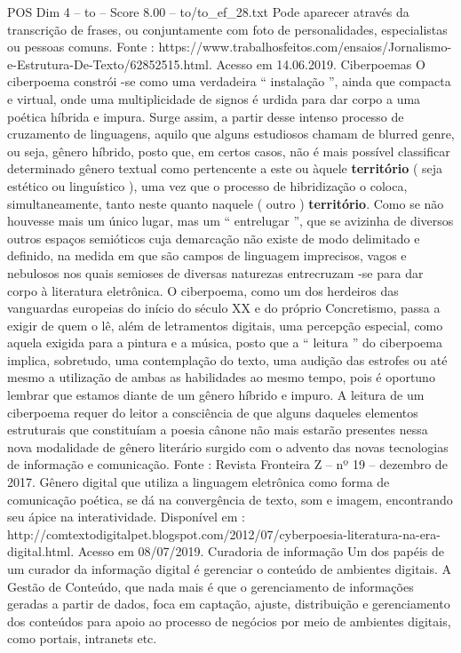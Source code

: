 \begin{textsample}{POS Dim 4 – to – Score 8.00 – to/to\_ef\_28.txt}
Pode aparecer através da transcrição de frases, ou conjuntamente com foto de personalidades, especialistas ou pessoas comuns.
Fonte : https://www.trabalhosfeitos.com/ensaios/Jornalismo-e-Estrutura-De-Texto/62852515.html.
Acesso em 14.06.2019.
Ciberpoemas O ciberpoema constrói -se como uma verdadeira “ instalação ”, ainda que compacta e virtual, onde uma multiplicidade de signos é urdida para dar corpo a uma poética híbrida e impura.
Surge assim, a partir desse intenso processo de cruzamento de linguagens, aquilo que alguns estudiosos chamam de blurred genre, ou seja, gênero híbrido, posto que, em certos casos, não é mais possível classificar determinado gênero textual como pertencente a este ou àquele \textbf{território} ( seja estético ou linguístico ), uma vez que o processo de hibridização o coloca, simultaneamente, tanto neste quanto naquele ( outro ) \textbf{território}.
Como se não houvesse mais um único lugar, mas um “ entrelugar ”, que se avizinha de diversos outros espaços semióticos cuja demarcação não existe de modo delimitado e definido, na medida em que são campos de linguagem imprecisos, vagos e nebulosos nos quais semioses de diversas naturezas entrecruzam -se para dar corpo à literatura eletrônica.
O ciberpoema, como um dos herdeiros das vanguardas europeias do início do século XX e do próprio Concretismo, passa a exigir de quem o lê, além de letramentos digitais, uma percepção especial, como aquela exigida para a pintura e a música, posto que a “ leitura ” do ciberpoema implica, sobretudo, uma contemplação do texto, uma audição das estrofes ou até mesmo a utilização de ambas as habilidades ao mesmo tempo, pois é oportuno lembrar que estamos diante de um gênero híbrido e impuro.
A leitura de um ciberpoema requer do leitor a consciência de que alguns daqueles elementos estruturais que constituíam a poesia cânone não mais estarão presentes nessa nova modalidade de gênero literário surgido com o advento das novas tecnologias de informação e comunicação.
Fonte : Revista Fronteira Z – nº 19 – dezembro de 2017.
Gênero digital que utiliza a linguagem eletrônica como forma de comunicação poética, se dá na convergência de texto, som e imagem, encontrando seu ápice na interatividade.
Disponível em : http://comtextodigitalpet.blogspot.com/2012/07/cyberpoesia-literatura-na-era-digital.html.
Acesso em 08/07/2019.
Curadoria de informação Um dos papéis de um curador da informação digital é gerenciar o conteúdo de ambientes digitais.
A Gestão de Conteúdo, que nada mais é que o gerenciamento de informações geradas a partir de dados, foca em captação, ajuste, distribuição e gerenciamento dos conteúdos para apoio ao processo de negócios por meio de ambientes digitais, como portais, intranets etc.

\end{textsample}
